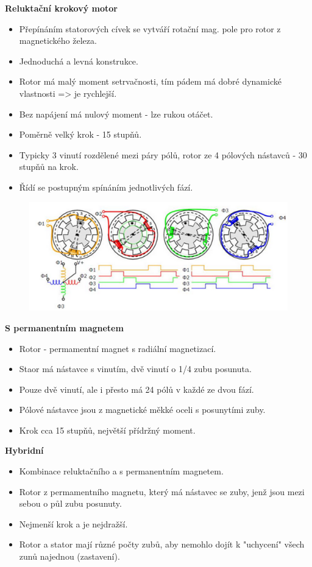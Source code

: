 \textbf{Reluktační krokový motor}
\begin{itemize}
  \item Přepínáním statorových cívek se vytváří rotační mag. pole pro rotor z magnetického železa.
  \item Jednoduchá a levná konstrukce.
  \item Rotor má malý moment setrvačnosti, tím pádem má dobré dynamické vlastnosti => je rychlejší.
  \item Bez napájení má nulový moment - lze rukou otáčet.
  \item Poměrně velký krok - 15 stupňů.
  \item Typicky 3 vinutí rozdělené mezi páry pólů, rotor ze 4 pólových nástavců - 30 stupňů na krok.
  \item Řídí se postupným spínáním jednotlivých fází.
\end{itemize}

\begin{figure}[h]
  \begin{center}
    \includegraphics[scale = 1]{img/picture7.png}
  \end{center}
\end{figure}

\textbf{S permanentním magnetem}
\begin{itemize}
  \item Rotor - permamentní magnet s radiální magnetizací.
  \item Staor má nástavce s vinutím, dvě vinutí o 1/4 zubu posunuta.
  \item Pouze dvě vinutí, ale i přesto má 24 pólů v každé ze dvou fází.
  \item Pólové nástavce jsou z magnetické měkké oceli s posunytími zuby.
  \item Krok cca 15 stupňů, největší přídržný moment.
\end{itemize}

\textbf{Hybridní}
\begin{itemize}
  \item Kombinace reluktačního a s permanentním magnetem. 
  \item Rotor z permamentního magnetu, který má nástavec se zuby, jenž jsou mezi sebou o půl zubu posunuty.
  \item Nejmenší krok a je nejdražší.
  \item Rotor a stator mají různé počty zubů, aby nemohlo dojít k "uchycení" všech zunů najednou (zastavení).
\end{itemize}

